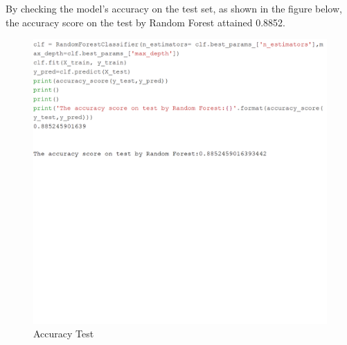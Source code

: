 By checking the model's accuracy on the test set, as shown in the
figure below, the accuracy score on the test by Random Forest attained
0.8852.

\begin{figure}
    \centering
    \includegraphics[width=1.0\columnwidth]{images/Untitled7.png}
    \caption{Accuracy Test}\label{Accuracy}
\end{figure}



